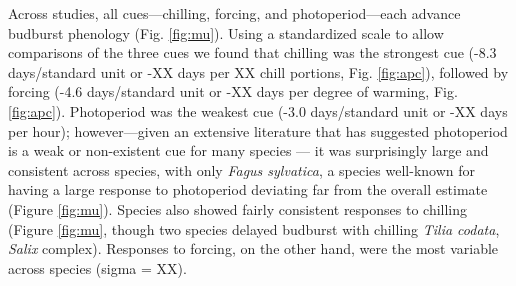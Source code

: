 \documentclass[11pt,letter]{article}
\begin{document}
\par Across studies, all cues---chilling, forcing, and photoperiod---each advance budburst phenology (Fig. \ref {fig:mu}). Using a standardized scale to allow comparisons of the three cues we found that chilling was the strongest cue (-8.3 days/standard unit or -XX days per XX chill portions, Fig. \ref {fig:apc}), followed by forcing (-4.6 days/standard unit or -XX days per degree of warming, Fig. \ref {fig:apc}). Photoperiod was the weakest cue (-3.0 days/standard unit or -XX days per hour); however---given an extensive literature that has suggested photoperiod is a weak or non-existent cue for many species \citep{zohner2016,koerner2010a}--- it was surprisingly large and consistent across species, with only \emph{Fagus sylvatica}, a species well-known for having a large response to photoperiod deviating far from the overall estimate (Figure \ref {fig:mu}). Species also showed fairly consistent responses to chilling (Figure \ref {fig:mu}, though two species delayed budburst with chilling \emph{Tilia codata}, \emph{Salix} complex). Responses to forcing, on the other hand, were the most variable across species (sigma = XX).

\end{document}
